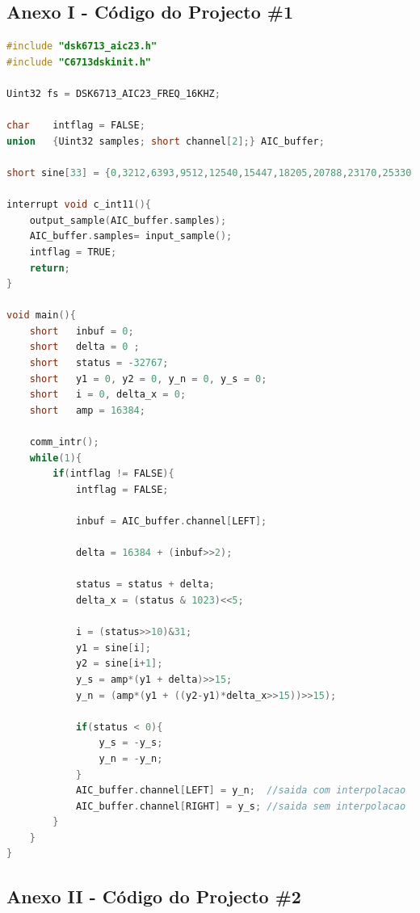 \documentclass[11pt]{article}
\numberwithin{equation}{section}
\begin{document}
\subsection{Anexo I - Código do Projecto \#1}

\begin{lstlisting}[language=C]
#include "dsk6713_aic23.h"
#include "C6713dskinit.h"

Uint32 fs = DSK6713_AIC23_FREQ_16KHZ;

char	intflag = FALSE;
union	{Uint32 samples; short channel[2];} AIC_buffer;

short sine[33] = {0,3212,6393,9512,12540,15447,18205,20788,23170,25330,27246,28899,30274,31357,		32138,32610,32767,32610,32138,31357,30274,28899,27246,25330,23170,20788,18205,	15447,12540,9512,6393,3212,0}; 

interrupt void c_int11(){                  	
	output_sample(AIC_buffer.samples); 
	AIC_buffer.samples= input_sample(); 
	intflag = TRUE;
	return;
}

void main(){
	short	inbuf = 0;
	short	delta = 0 ;
	short	status = -32767;
	short	y1 = 0, y2 = 0, y_n = 0, y_s = 0;
	short	i = 0, delta_x = 0;
	short	amp = 16384;
	
	comm_intr();
	while(1){
		if(intflag != FALSE){
			intflag = FALSE;
				
			inbuf = AIC_buffer.channel[LEFT];
			
			delta = 16384 + (inbuf>>2);
			
			status = status + delta;
			delta_x = (status & 1023)<<5;
			
			i = (status>>10)&31;
			y1 = sine[i];
			y2 = sine[i+1];
			y_s = amp*(y1 + delta)>>15;  
			y_n = (amp*(y1 + ((y2-y1)*delta_x>>15))>>15);
			
			if(status < 0){
				y_s = -y_s;
				y_n = -y_n;
			}
			AIC_buffer.channel[LEFT] = y_n;  //saida com interpolacao
			AIC_buffer.channel[RIGHT] = y_s; //saida sem interpolacao
		}
	}
}
\end{lstlisting}

\subsection{Anexo II - Código do Projecto \#2}
\end{document}
